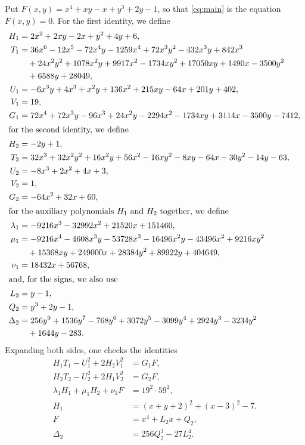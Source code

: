 \documentclass[11pt]{article}
\begin{document}
Put $F(x,y)=x^{4}+xy-x+y^{3}+2y-1$, so that \eqref{eq:main} is the equation $F(x,y)=0$. For the first identity, we define
\begin{align*}
H_{1}&=2x^{2}+2xy-2x+y^{2}+4y+6,\\
T_{1}&=36x^{6}-12x^{5}-72x^{4}y-1259x^{4}+72x^{3}y^{2}-432x^{3}y+842x^{3}\\
&\quad+24x^{2}y^{2}+1078x^{2}y+9917x^{2}-1734xy^{2}+17050xy+1490x-3500y^{2}\\
&\quad+6588y+28049,\\
U_{1}&=-6x^{3}y+4x^{3}+x^{2}y+136x^{2}+215xy-64x+201y+402,\\
V_{1}&=19,\\
G_{1}&=72x^{4}+72x^{3}y-96x^{3}+24x^{2}y-2294x^{2}-1734xy+3114x-3500y-7412,\\
\intertext{for the second identity, we define}
H_{2}&=-2y+1,\\
T_{2}&=32x^{3}+32x^{2}y^{2}+16x^{2}y+56x^{2}-16xy^{2}-8xy-64x-30y^{2}-14y-63,\\
U_{2}&=-8x^{3}+2x^{2}+4x+3,\\
V_{2}&=1,\\
G_{2}&=-64x^{2}+32x+60,\\
\intertext{for the auxiliary polynomials $H_{1}$ and $H_{2}$ together, we define}
\lambda_{1}&=-9216x^{3}-32992x^{2}+21520x+151460,\\
\mu_{1}&=-9216x^{4}-4608x^{3}y-53728x^{3}-16496x^{2}y-43496x^{2}+9216xy^{2}\\
&\quad+15368xy+249000x+28384y^{2}+89922y+404649,\\
\nu_{1}&=18432x+56768,\\
\intertext{and, for the signs, we also use}
L_{2}&=y-1,\\
Q_{2}&=y^{3}+2y-1,\\
\Delta_{2}&=256y^{9}+1536y^{7}-768y^{6}+3072y^{5}-3099y^{4}+2924y^{3}-3234y^{2}\\
&\quad+1644y-283.
\end{align*}
Expanding both sides, one checks the identities
\begin{align}
H_{1}T_{1}-U_{1}^2+2H_{2}V_{1}^2&=G_{1}F,\label{eq:norm1}\\
H_{2}T_{2}-U_{2}^2+2H_{1}V_{2}^2&=G_{2}F,\label{eq:norm2}\\
\lambda_{1}H_{1}+\mu_{1}H_{2}+\nu_{1}F&=19^{2}\cdot 59^{2},\label{eq:cross1}\\
H_{1}&=(x+y+2)^2+(x-3)^2-7.\label{eq:sign1}\\
F&=x^4+L_{2}x+Q_{2},\label{eq:sign2}\\
\Delta_{2}&=256Q_{2}^3-27L_{2}^4.\label{eq:sign2b}
\end{align}
\end{document}
